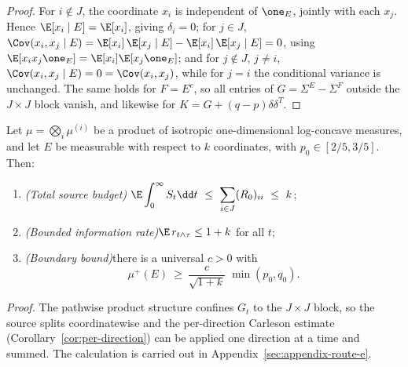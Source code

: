 \documentclass[../../main.tex]{subfiles}
\begin{document}
\begin{proof}
For $i\notin J$, the coordinate $x_i$ is independent of $\one_E$, jointly with each $x_j$.
Hence $\E[x_i\mid E]=\E[x_i]$, giving $\delta_i=0$; for $j\in J$,
$\Cov(x_i,x_j\mid E)=\E[x_i]\,\E[x_j\mid E]-\E[x_i]\,\E[x_j\mid E]=0$, using
$\E[x_ix_j\one_E]=\E[x_i]\E[x_j\one_E]$; and for $j\notin J$, $j\ne i$,
$\Cov(x_i,x_j\mid E)=0=\Cov(x_i,x_j)$, while for $j=i$ the conditional variance is unchanged.
The same holds for $F=E^c$, so all entries of $G=\Sigma^E-\Sigma^F$ outside the $J\times J$
block vanish, and likewise for $K=G+(q-p)\delta\delta^T$.
\end{proof}

\begin{theorem}
\label{thm:budget}
Let $\mu=\bigotimes_i\mu^{(i)}$ be a product of isotropic one-dimensional log-concave
measures, and let $E$ be measurable with respect to $k$ coordinates, with
$p_0\in[2/5,3/5]$. Then:
\begin{enumerate}[label=(\roman*),leftmargin=2.2em]
\item \emph{(Total source budget)}\quad
$\displaystyle \E\int_0^\infty S_t\dd t\ \le\ \sum_{i\in J}(R_0)_{ii}\ \le\ k$;
\item \emph{(Bounded information rate)}\quad $\E\,r_{t\wedge\tau}\le1+k$ for all $t$;
\item \emph{(Boundary bound)}\quad there is a universal $c>0$ with
\[
  \mu^+(E)\ \ge\ \frac{c}{\sqrt{1+k}}\;\min(p_0,q_0).
\]
\end{enumerate}
\end{theorem}

\noindent\emph{Proof.} The pathwise product structure confines $G_t$ to the $J\times J$ block, so the source splits coordinatewise and the per-direction Carleson estimate (Corollary~\ref{cor:per-direction}) can be applied one direction at a time and summed. The calculation is carried out in Appendix~\ref{sec:appendix-route-e}.
\end{document}
